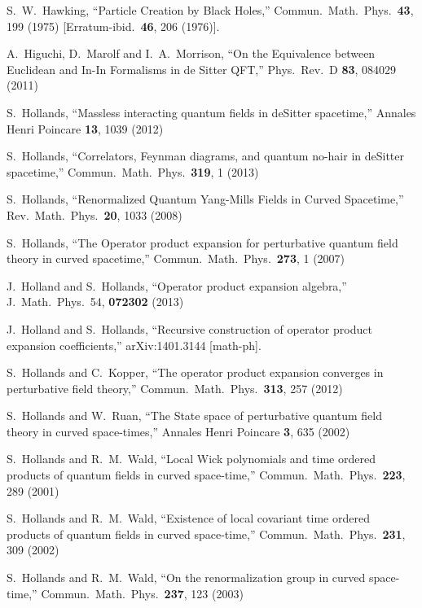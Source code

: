 \documentclass[12pt]{article}
\theoremstyle{plain}
\theoremstyle{definition}
\begin{document}
\begin{thebibliography}{99}
S.~W.~Hawking,
  ``Particle Creation by Black Holes,''
  Commun.\ Math.\ Phys.\  {\bf 43}, 199 (1975)
  [Erratum-ibid.\  {\bf 46}, 206 (1976)].

 A.~Higuchi, D.~Marolf and I.~A.~Morrison,
  ``On the Equivalence between Euclidean and In-In Formalisms in de Sitter QFT,''
  Phys.\ Rev.\ D {\bf 83}, 084029 (2011)


 S.~Hollands,
  ``Massless interacting quantum fields in deSitter spacetime,''
  Annales Henri Poincare {\bf 13}, 1039 (2012)


 S.~Hollands,
  ``Correlators, Feynman diagrams, and quantum no-hair in deSitter spacetime,''
  Commun.\ Math.\ Phys.\  {\bf 319}, 1 (2013)


 S.~Hollands,
  ``Renormalized Quantum Yang-Mills Fields in Curved Spacetime,''
  Rev.\ Math.\ Phys.\  {\bf 20}, 1033 (2008)


 S.~Hollands,
  ``The Operator product expansion for perturbative quantum field theory in curved spacetime,''
  Commun.\ Math.\ Phys.\  {\bf 273}, 1 (2007)


 J.~Holland and S.~Hollands,
  ``Operator product expansion algebra,''
  J.\  Math.\  Phys.\  54, {\bf 072302} (2013)


J.~Holland and S.~Hollands,
``Recursive construction of operator product expansion coefficients,''
  arXiv:1401.3144 [math-ph].


 S.~Hollands and C.~Kopper,
  ``The operator product expansion converges in perturbative field theory,''
  Commun.\ Math.\ Phys.\  {\bf 313}, 257 (2012)


S.~Hollands and W.~Ruan,
  ``The State space of perturbative quantum field theory in curved space-times,''
  Annales Henri Poincare {\bf 3}, 635 (2002)


S.~Hollands and R.~M.~Wald,
  ``Local Wick polynomials and time ordered products of quantum fields in curved space-time,''
  Commun.\ Math.\ Phys.\  {\bf 223}, 289 (2001)
 

S.~Hollands and R.~M.~Wald,
  ``Existence of local covariant time ordered products of quantum fields in curved space-time,''
  Commun.\ Math.\ Phys.\  {\bf 231}, 309 (2002)


  S.~Hollands and R.~M.~Wald,
  ``On the renormalization group in curved space-time,''
  Commun.\ Math.\ Phys.\  {\bf 237}, 123 (2003)



\end{thebibliography}
\end{document}
